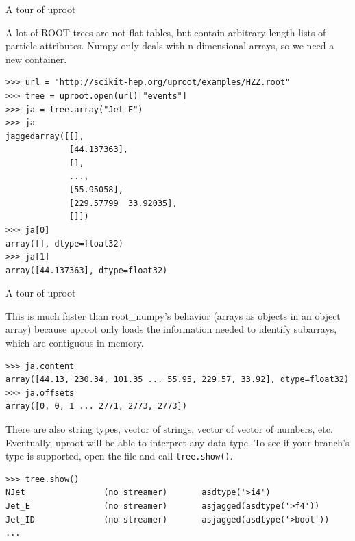 \documentclass[aspectratio=169]{beamer}
\begin{document}
\begin{frame}[fragile]{A tour of uproot}
\vspace{0.4 cm}
\small

{\normalsize A lot of ROOT trees are not flat tables, but contain arbitrary-length lists of particle attributes. Numpy only deals with n-dimensional arrays, so we need a new container.}

\begin{verbatim}
>>> url = "http://scikit-hep.org/uproot/examples/HZZ.root"
>>> tree = uproot.open(url)["events"]
>>> ja = tree.array("Jet_E")
>>> ja
jaggedarray([[],
             [44.137363],
             [],
             ...,
             [55.95058],
             [229.57799  33.92035],
             []])
>>> ja[0]
array([], dtype=float32)
>>> ja[1]
array([44.137363], dtype=float32)
\end{verbatim}
\end{frame}

\begin{frame}[fragile]{A tour of uproot}
\vspace{0.4 cm}
\small

{\normalsize This is much faster than root\_numpy's behavior (arrays as objects in an object array) because uproot only loads the information needed to identify subarrays, which are contiguous in memory.}

\begin{verbatim}
>>> ja.content
array([44.13, 230.34, 101.35 ... 55.95, 229.57, 33.92], dtype=float32)
>>> ja.offsets
array([0, 0, 1 ... 2771, 2773, 2773])
\end{verbatim}

\vspace{0.2 cm}
{\normalsize There are also string types, vector of strings, vector of vector of numbers, etc. Eventually, uproot will be able to interpret any data type. To see if your branch's type is supported, open the file and call {\tt\small tree.show()}.}

\begin{verbatim}
>>> tree.show()
NJet                (no streamer)       asdtype('>i4')
Jet_E               (no streamer)       asjagged(asdtype('>f4'))
Jet_ID              (no streamer)       asjagged(asdtype('>bool'))
...
\end{verbatim}
\end{frame}
\end{document}
